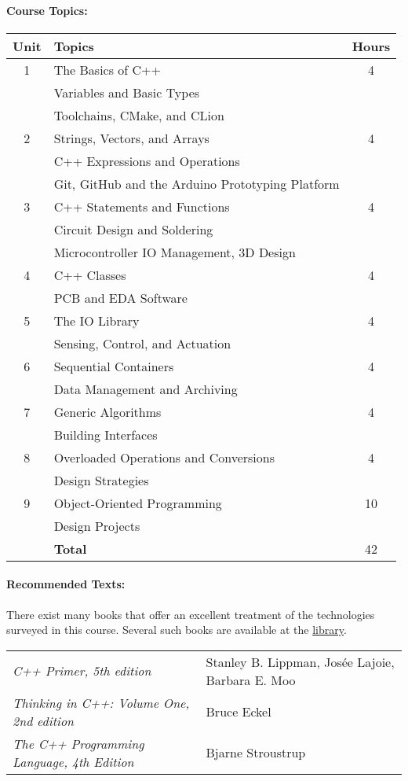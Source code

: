 \documentclass{article}
\begin{document}
\paragraph*{Course Topics:}
\begin{center}
\begin{tabular}{|c|p{8cm}|c|}
\hline
Unit & Topics & Hours \tabularnewline
\hline
1 & The Basics of C++ & 4 \tabularnewline
& Variables and Basic Types & \tabularnewline
& Toolchains, CMake, and CLion & \tabularnewline
\hline
2 & Strings, Vectors, and Arrays & 4 \tabularnewline
& C++ Expressions and Operations & \tabularnewline
& Git, GitHub and the Arduino Prototyping Platform & \tabularnewline
\hline
3 & C++ Statements and Functions & 4 \tabularnewline
& Circuit Design and Soldering & \tabularnewline
& Microcontroller IO Management, 3D Design & \tabularnewline
\hline
4 & C++ Classes & 4 \tabularnewline
& PCB and EDA Software & \tabularnewline
\hline
5 & The IO Library & 4 \tabularnewline
& Sensing, Control, and Actuation & \tabularnewline
\hline
6 & Sequential Containers & 4 \tabularnewline
& Data Management and Archiving & \tabularnewline
\hline
7 & Generic Algorithms & 4 \tabularnewline
& Building Interfaces & \tabularnewline
\hline
8 & Overloaded Operations and Conversions & 4 \tabularnewline
& Design Strategies & \tabularnewline
\hline
9 & Object-Oriented Programming & 10 \tabularnewline
& Design Projects & \tabularnewline
\hline
& \textbf{Total} & 42 \tabularnewline
\hline
\end{tabular}
\end{center}


\paragraph{Recommended Texts:}
There exist many books that offer an excellent treatment of the technologies surveyed in this course.
Several such books are available at the \href{http://library.tamu.edu}{library}.
\begin{center}
\begin{tabular}{ll}
\emph{C++ Primer, 5th edition} & Stanley B. Lippman, Jos\'{e}e Lajoie, Barbara E. Moo \tabularnewline[1mm]
\emph{Thinking in C++: Volume One, 2nd edition} & Bruce Eckel \tabularnewline[1mm]
\emph{The C++ Programming Language, 4th Edition} & Bjarne Stroustrup \tabularnewline[1mm]
\end{tabular}
\end{center}


%
\end{document}
